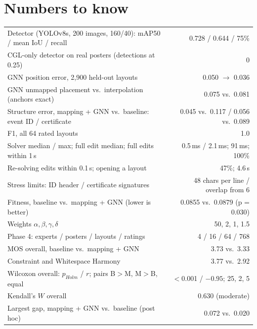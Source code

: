 \documentclass[10pt,a4paper]{article}
\begin{document}
\section{Numbers to know}
\begin{tabularx}{\linewidth}{@{}Xr@{}}
\toprule
Detector (YOLOv8s, 200 images, 160/40): mAP50 / mean IoU / recall & 0.728 / 0.644 / 75\% \\
CGL-only detector on real posters (detections at 0.25) & 0 \\
GNN position error, 2,900 held-out layouts & 0.050 $\to$ 0.036 \\
GNN unmapped placement vs.\ interpolation (anchors exact) & 0.075 vs.\ 0.081 \\
Structure error, mapping + GNN vs.\ baseline: event ID / certificate & 0.045 vs.\ 0.117 / 0.056 vs.\ 0.089 \\
F1, all 64 rated layouts & 1.0 \\
Solver median / max; full edit median; full edits within 1\,s & 0.5\,ms / 2.1\,ms; 91\,ms; 100\% \\
Re-solving edits within 0.1\,s; opening a layout & 47\%; 4.6\,s \\
Stress limits: ID header / certificate signatures & 48 chars per line / overlap from 6 \\
Fitness, baseline vs.\ mapping + GNN (lower is better) & 0.0855 vs.\ 0.0879 (p = 0.030) \\
Weights $\alpha, \beta, \gamma, \delta$ & 50, 2, 1, 1.5 \\
Phase 4: experts / posters / layouts / ratings & 4 / 16 / 64 / 768 \\
MOS overall, baseline vs.\ mapping + GNN & 3.73 vs.\ 3.33 \\
Constraint and Whitespace Harmony & 3.77 vs.\ 2.92 \\
Wilcoxon overall: $p_{Holm}$ / $r$; pairs B$>$M, M$>$B, equal & $<$0.001 / $-0.95$; 25, 2, 5 \\
Kendall's $W$ overall & 0.630 (moderate) \\
Largest gap, mapping + GNN vs.\ baseline (post hoc) & 0.072 vs.\ 0.020 \\
\bottomrule
\end{tabularx}


\end{document}
